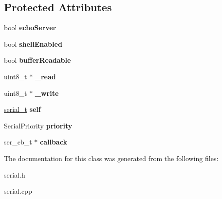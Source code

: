 \subsection*{Protected Attributes}
\begin{DoxyCompactItemize}
\item 
\mbox{\label{classSerial_a71585071c3169b915300f84557d273d3}} 
bool {\bfseries echo\+Server}
\item 
\mbox{\label{classSerial_a3ae40010a266baadc7a7d1c655d0f3ab}} 
bool {\bfseries shell\+Enabled}
\item 
\mbox{\label{classSerial_a58f8acbb0746b9dce8992d68ab380098}} 
bool {\bfseries buffer\+Readable}
\item 
\mbox{\label{classSerial_a461b01260601124608caefb58aa97321}} 
uint8\+\_\+t $\ast$ {\bfseries \+\_\+read}
\item 
\mbox{\label{classSerial_adf357435a54ad0273470165af0b32b40}} 
uint8\+\_\+t $\ast$ {\bfseries \+\_\+write}
\item 
\mbox{\label{classSerial_ace848b00193579670c9092e2866b04c5}} 
\mbox{\hyperlink{structserial__t}{serial\+\_\+t}} {\bfseries self}
\item 
\mbox{\label{classSerial_a456da36721b84dab734da1b47e39545e}} 
Serial\+Priority {\bfseries priority}
\item 
\mbox{\label{classSerial_aa18535152da1ad701fc2470451974c32}} 
ser\+\_\+cb\+\_\+t $\ast$ {\bfseries callback}
\end{DoxyCompactItemize}


The documentation for this class was generated from the following files\+:\begin{DoxyCompactItemize}
\item 
serial.\+h\item 
serial.\+cpp\end{DoxyCompactItemize}
